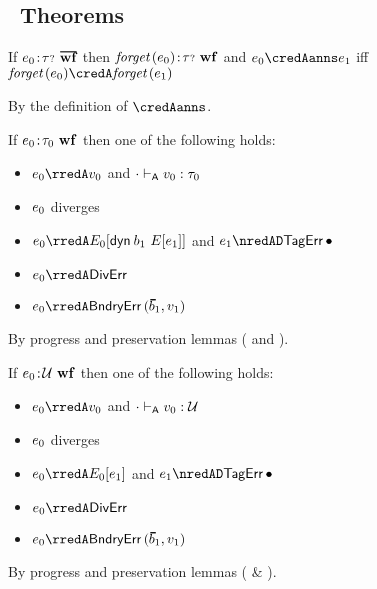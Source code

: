 \subsection{\Aname{}\ Theorems}

\begin{theorem}\label{A-sync}
  If\/ $\fwellformedO{\sexpr_0}{\stoptional}$
  then\/ $\textit{forget}\,(e_0)\!:\!{\tau{\scriptstyle ?}}~\mathbf{wf}$
  and\/ $\sexpr_0 \credAanns \sexpr_1$
  iff\/ $\fforget{\sexpr_0} \credA \fforget{\sexpr_1}$
\end{theorem}
\begin{lamportproof}
  By the definition of $\credAanns$.
\end{lamportproof}

\begin{theorem}\label{A-S-type-soundness}
  If\/ $e_0\!:\!\tau_0~\mathbf{wf}$
  then one of the following holds:
  \begin{itemize}
    \item $\sexpr_0 \rredA \svalue_0$ and\/ ${\cdot} \vdash_{\mathsf{A}} v_0 : \tau_0$
    \item $e_0$ diverges
    \item $\sexpr_0 \rredA
      \ctx_0[\edynb{\sbnd_1}{\ctx[\sexpr_1]}]$ and\/ $\sexpr_1 \nredAD
      \tagerrorD$
    \item $\sexpr_0 \rredA \divisionbyzeroerror$
    \item $\sexpr_0 \rredA \boundaryerror{\sblist_1}{\svalue_1}$
  \end{itemize}
\end{theorem}
\begin{lamportproof}
  By progress and preservation lemmas ( and ).
\end{lamportproof}

\begin{theorem}\label{A-D-type-soundness}
  If\/ $e_0\!:\!{\mathcal U}~\mathbf{wf}$
  then one of the following holds:
  \begin{itemize}
    \item $\sexpr_0 \rredA \svalue_0$ and\/ ${\cdot} \vdash_{\mathsf{A}} v_0 : {\mathcal U}$
    \item $e_0$ diverges
    \item $\sexpr_0 \rredA \ctx_0[\sexpr_1]$ and\/ $\sexpr_1
      \nredAD \tagerrorD$
    \item $\sexpr_0 \rredA \divisionbyzeroerror$
    \item $\sexpr_0 \rredA \boundaryerror{\sblist_1}{\svalue_1}$
  \end{itemize}
\end{theorem}
\begin{lamportproof}
  By progress and preservation lemmas ( \& ).
\end{lamportproof}

